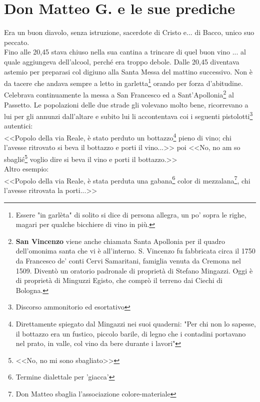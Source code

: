 
\chapter{Don Matteo G. e le sue prediche}
Era un buon diavolo, senza istruzione, sacerdote di Cristo e... di Bacco, unico suo peccato.\\
\indent Fino alle 20,45 stava chiuso nella sua cantina a trincare di quel buon vino ... al quale aggiungeva dell'alcool, perché era troppo debole. Dalle 20,45 diventava astemio per preparasi col digiuno alla Santa Messa del mattino successivo. Non è da tacere che andava sempre a letto in garletta\footnote{Essere "in garlèta" di solito si dice di persona allegra, un po' sopra le righe, magari per qualche bicchiere di vino in più.} orando per forza d'abitudine. Celebrava continuamente la messa a San Francesco ed a Sant'Apollonia\footnote{\textbf{San Vincenzo} viene anche chiamata Santa Apollonia per il quadro dell'omonima santa che vi è all'interno. S. Vincenzo fu fabbricata circa il 1750 da Francesco de' conti Cervi Samaritani, famiglia venuta da Cremona nel 1509. Diventò un oratorio padronale di proprietà di Stefano Mingazzi. Oggi è di proprietà di Minguzzi Egisto, che comprò il terreno dai Ciechi di Bologna.} al Passetto. Le popolazioni delle due strade gli volevano molto bene, ricorrevano a lui per gli annunzi dall'altare e subito lui li accontentava coi i seguenti pistolotti\footnote{Discorso ammonitorio ed esortativo} autentici:\\
\indent <<Popolo della via Reale, è stato perduto un bottazzo\footnote{Direttamente spiegato dal Mingazzi nei suoi quaderni: "Per chi non lo sapesse, il bottazzo era un fustico, piccolo barile, di legno che i contadini portavano nel prato, in valle, col vino da bere durante i lavori"} pieno di vino; chi l'avesse ritrovato si beva il bottazzo e porti il vino...>> poi <<No, no am so sbaglié\footnote{<<No, no mi sono sbagliato>>} voglio dire si beva il vino e porti il bottazzo.>>\\
\indent Altro esempio:\\
\indent<<Popolo della via Reale, è stata perduta una gabana\footnote{Termine dialettale per 'giacca'} color di mezzalana\footnote{Don Matteo sbaglia l'associazione colore-materiale}, chi l'avesse ritrovata la porti...>>

